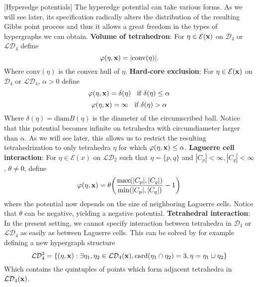 \begin{ex}\label{ex:potentials}[Hyperedge potentials]
	The hyperedge potential can take various forms. As we will see later, its specification radically alters the distribution of the resulting Gibbs point process and thus it allows a great freedom in the types of hypergraphs we can obtain.\newline
	\textbf{Volume of tetrahedron}: For $\eta\in\mathcal E({\mathbf{x}})$ on $\mathcal D_4$ or $\mathcal {LD}_4$ define
	$$\varphi(\eta,{\mathbf{x}}) = |\mathrm{conv}(\eta)| .$$
	Where $\mathrm{conv}(\eta)$ is the convex hull of $\eta$.	\newline
	\textbf{Hard-core exclusion}: For $\eta\in\mathcal E({\mathbf{x}})$ on $\mathcal D_4$ or $\mathcal {LD}_4$, $\alpha >0$ define
	$$\varphi(\eta,{\mathbf{x}}) = \delta(\eta)\;\; \text{ if } \delta(\eta) \leq \alpha$$
	$$\varphi(\eta,{\mathbf{x}}) = \infty \;\; \text { if } \delta(\eta) > \alpha$$
	Where $\delta(\eta)= \mathrm{diam}B(\eta)$ is the diameter of the circumscribed ball. Notice that this potential becomes infinite on tetrahedra with circumdiameter larger than $\alpha$. As we will see later, this allows us to restrict the resulting tetrahedrization to only tetrahedra $\eta$ for which $\varphi(\eta,{\mathbf{x}}) \leq \alpha$.\newline
	\textbf{Laguerre cell interaction}: For $\eta \in \mathcal E(x)$ on $\mathcal {LD}_2$ such that $\eta=\{p,q\}$ and $|C_p| < \infty, |C_q| < \infty$, $\theta \neq 0$, define
$$\varphi(\eta,{\mathbf{x}}) = \theta \bigg (\frac {\max ( |C_p|, |C_q|)}{\min(|C_p|,|C_q|)} - 1\bigg)$$
where the potential now depends on the size of neighboring Laguerre cells. Notice that $\theta$ can be negative, yielding a negative potential. \newline
\textbf{Tetrahedral interaction}: In the present setting, we cannot specify interaction between tetrahedra in $\mathcal D_4$ or $\mathcal {LD}_4$ as easily as between Laguerre cells. This can be solved by for example defining a new hypergraph structure
$$\mathcal {LD}^2_4 = \{(\eta,{\mathbf{x}}): \exists \eta_1,\eta_2\in\mathcal {LD}_4({\mathbf{x}}), \mathrm{card}(\eta_1 \cap \eta_2)=3, \eta = \eta_1 \cup \eta_2\}$$
Which contains the quintuples of points which form adjacent tetrahedra in $\mathcal {LD}_4({\mathbf{x}})$. 
\end{ex}

